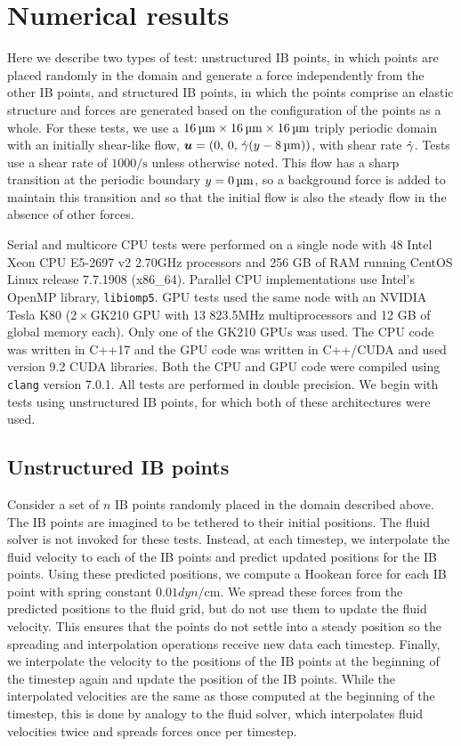 \section{Numerical results} \label{sec:results}

Here we describe two types of test: unstructured IB points, in which points are placed
randomly in the domain and generate a force independently from the other IB points, and
structured IB points, in which the points comprise an elastic structure and forces are
generated based on the configuration of the points as a whole. For these tests, we use
a $16\um\times16\um\times16\um$ triply periodic domain with an initially shear-like flow,
$\u=(0,\,0,\,\shear(y-8\um))$, with shear rate $\dot{\gamma}$. Tests use a shear rate of
$1000\si{\per\second}$ unless otherwise noted. This flow has a sharp transition at the
periodic boundary $y=0\um$, so a background force is added to maintain this transition
and so that the initial flow is also the steady flow in the absence of other forces.

Serial and multicore CPU tests were performed on a single node with 48 Intel{\reg}
Xeon{\reg} CPU E5-2697 v2 2.70\si{\giga\hertz} processors and 256 GB of RAM running
CentOS Linux release 7.7.1908 (x86\_64). Parallel CPU implementations use Intel's OpenMP
library, \texttt{libiomp5}. GPU tests used the same node with an NVIDIA{\reg} Tesla{\reg}
K80 ($2\times$GK210 GPU with 13 823.5\si{\mega\hertz} multiprocessors and 12 GB of global
memory each). Only one of the GK210 GPUs was used. The CPU code was written in C++17 and
the GPU code was written in C++/CUDA and used version 9.2 CUDA libraries. Both the CPU
and GPU code were compiled using \texttt{clang} version 7.0.1. All tests are performed in
double precision. We begin with tests using unstructured IB points, for which both of
these architectures were used.

\subsection{Unstructured IB points}\label{sec:unst}

Consider a set of $n$ IB points randomly placed in the domain described above. The IB
points are imagined to be tethered to their initial positions. The fluid solver is not
invoked for these tests. Instead, at each timestep, we interpolate the fluid velocity to
each of the IB points and predict updated positions for the IB points. Using these
predicted positions, we compute a Hookean force for each IB point with spring constant
$0.01\si{dyn\per\centi\meter}$. We spread these forces from the predicted positions to
the fluid grid, but do not use them to update the fluid velocity. This ensures that the
points do not settle into a steady position so the spreading and interpolation operations
receive new data each timestep. Finally, we interpolate the velocity to the positions of
the IB points at the beginning of the timestep again and update the position of the IB
points. While the interpolated velocities are the same as those computed at the beginning
of the timestep, this is done by analogy to the fluid solver, which interpolates fluid
velocities twice and spreads forces once per timestep.

